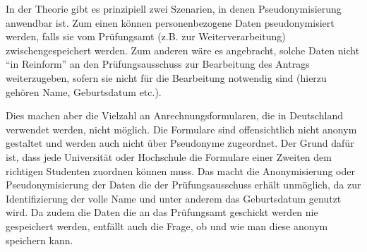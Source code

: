 In der Theorie gibt es prinzipiell zwei Szenarien, in denen Pseudonymisierung anwendbar ist. Zum einen können personenbezogene Daten pseudonymisiert werden, falls sie vom Prüfungsamt (z.B. zur Weiterverarbeitung) zwischengespeichert werden. Zum anderen wäre es angebracht, solche Daten nicht “in Reinform” an den Prüfungsausschuss zur Bearbeitung des Antrags weiterzugeben, sofern sie nicht für die Bearbeitung notwendig sind (hierzu gehören Name, Geburtsdatum etc.).

Dies machen aber die Vielzahl an Anrechnungsformularen, die in Deutschland verwendet werden, nicht möglich. Die Formulare sind offensichtlich nicht anonym gestaltet und werden auch nicht über Pseudonyme zugeordnet. Der Grund dafür ist, dass jede Universität oder Hochschule die Formulare einer Zweiten dem richtigen Studenten zuordnen können muss. Das macht die Anonymisierung oder Pseudonymisierung der Daten die der Prüfungsausschuss erhält unmöglich, da zur Identifizierung der volle Name und unter anderem das Geburtsdatum genutzt wird. Da zudem die Daten die an das Prüfungsamt geschickt werden nie gespeichert werden, entfällt auch die Frage, ob und wie man diese anonym speichern kann.
